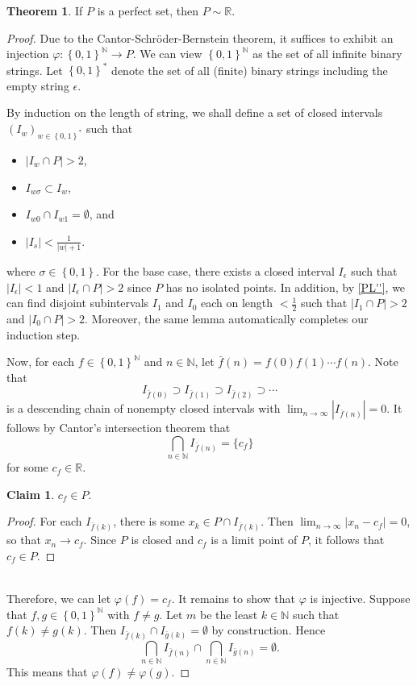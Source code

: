 \documentclass[10pt,letterpaper,cm]{nupset}
\theoremstyle{definition}
\theoremstyle{theorem}
\newtheorem{theorem}[definition]{Theorem}
\newtheorem*{claim}{Claim}
\theoremstyle{remark}
\newcommand{\N}{\mathbb N}
\newcommand{\R}{\mathbb R}
\newcommand{\1}{\mathbf{1}}
\newcommand{\0}{\vec 0}
\begin{document}
\begin{theorem}
If $P$ is a perfect set, then $P \sim \R$.
\end{theorem}
\begin{proof}
Due to  the Cantor-Schr\"oder-Bernstein theorem, it suffices to exhibit an injection $\varphi : \left\{0, 1\right\}^{\N} \to P$. We can view $ \left\{0, 1\right\}^{\N}$ as the set of all infinite binary strings. Let $\left\{0, 1\right\}^{\ast}$ denote the set of all (finite) binary strings including the empty string $\epsilon$. 

\smallskip

By induction on the length of string, we shall define a set of closed intervals $\left(I_w\right)_{w\in \left\{0, 1\right\}^{\ast}}$ such that
\begin{itemize}
\item $\left\lvert{I_w \cap P}\right\rvert >2$,
\item $I_{w\sigma}\subset I_w$,
\item $I_{w0} \cap I_{w1} = \emptyset$, and
\item $\left\lvert{I_s}\right\rvert < \frac{1}{\left\lvert{w}\right\rvert+1}$.
\end{itemize}
where $\sigma \in \left\{0, 1\right\}$. For the base case, there exists a closed interval $I_{\epsilon}$ such that $\left\lvert{I_{\epsilon}}\right\rvert < 1$ and $\left\lvert{I_{\epsilon}\cap P}\right\rvert >2$ since $P$ has no isolated points. In addition, by \cref{PL''}, we can find disjoint subintervals $I_1$ and $I_0$ each on length $< \frac{1}{2}$ such that $\left\lvert{I_1 \cap P}\right\rvert>2$ and $\left\lvert{I_0 \cap P}\right\rvert >2$. Moreover, the same lemma automatically completes our induction step. 

\smallskip

 Now, for each $f\in \left\{0, 1\right\}^{\N}$ and $n\in \N$, let $\bar{f}(n) = f(0)f(1)\cdots f(n)  $. Note that $$I_{\bar{f}(0)}\supset  I_{\bar{f}(1)} \supset I_{\bar{f}(2)} \supset \cdots $$  is a descending chain of nonempty closed intervals with $\lim_{n\to \infty} \left\lvert{I_{\bar{f}(n)}}\right\rvert =0$. It follows by  Cantor's intersection theorem  that $$\bigcap_{n \in \N} I_{\bar{f}(n)} = \{c_f\}$$ for some $c_f \in \R$. 
\begin{claim}
$c_f \in P$. 
\end{claim}
\begin{proof}
For each $I_{\bar{f}(k)}$, there is some $x_k \in P \cap I_{\bar{f}(k)}$. Then $\lim_{n\to \infty} \left\lvert{x_n - c_f}\right\rvert = 0$, so that $x_n \to c_f$. Since $P$ is closed and $c_f$ is a limit point of $P$, it follows that $c_f \in P$. 
\end{proof}$ $
\\Therefore, we can let $\varphi(f) = c_f$. It remains to show that $\varphi$ is injective. Suppose that $f, g \in \left\{0, 1\right\}^{\N}$ with $f \ne g$.  Let $m$ be the least $k \in \N$ such that $f(k) \ne g(k)$. Then $I_{\bar{f}(k)} \cap I_{\bar{g}(k)} = \emptyset$ by construction. Hence $$\bigcap_{n \in \N} I_{\bar{f}(n)} \cap \bigcap_{n \in \N} I_{\bar{g}(n)} = \emptyset .$$ This means that $\varphi(f) \ne \varphi(g)$.
\end{proof}
\end{document}
